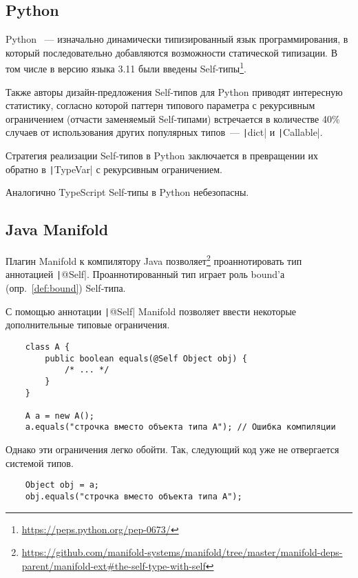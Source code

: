 \subsection{Python}

Python~\cite{sanner1999python} --- изначально динамически типизированный язык программирования, в который последовательно добавляются возможности статической типизации.
В том числе в версию языка 3.11 были введены Self-типы\footnote{\url{https://peps.python.org/pep-0673/}\label{foot:self-pep}}.

Также авторы дизайн-предложения Self-типов для Python приводят интересную статистику, согласно которой паттерн типового параметра с рекурсивным ограничением (отчасти заменяемый Self-типами) встречается в количестве 40\% случаев от использования других популярных типов~--- \texttt|dict| и \texttt|Callable|.

Стратегия реализации Self-типов в Python заключается в превращении их обратно в \texttt|TypeVar| с рекурсивным ограничением.

Аналогично TypeScript Self-типы в Python небезопасны.

\subsection{Java Manifold}

Плагин Manifold к компилятору Java позволяет\footnote{\url{https://github.com/manifold-systems/manifold/tree/master/manifold-deps-parent/manifold-ext\#the-self-type-with-self}} проаннотировать тип аннотацией \texttt|@Self|.
Проаннотированный тип играет роль bound'а (опр.~\ref{def:bound}) Self-типа.

С помощью аннотации \texttt|@Self| Manifold позволяет ввести некоторые дополнительные типовые ограничения.

\begin{verbatim}
    class A {
        public boolean equals(@Self Object obj) {
            /* ... */
        }
    }

    A a = new A();
    a.equals("строчка вместо объекта типа A"); // Ошибка компиляции
\end{verbatim}

Однако эти ограничения легко обойти.
Так, следующий код уже не отвергается системой типов.

\begin{verbatim}
    Object obj = a;
    obj.equals("строчка вместо объекта типа A");
\end{verbatim}

